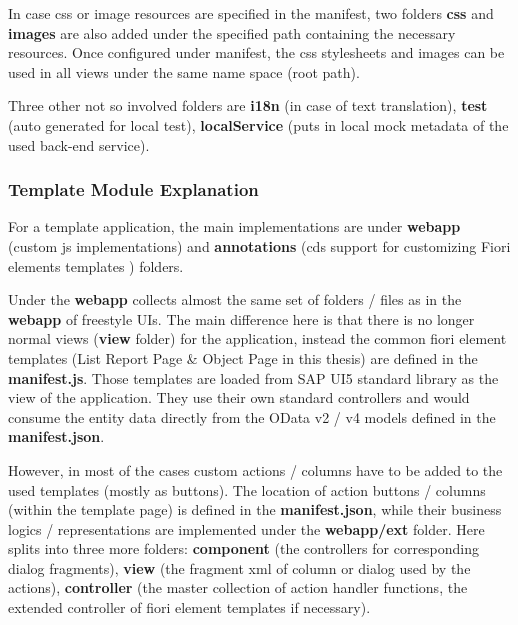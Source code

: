 In case css or image resources are specified in the manifest, two folders \textbf{css} and \textbf{images} are also added under the specified path containing the necessary resources. Once configured under manifest, the css stylesheets and images can be used in all views under the same name space (root path).

Three other not so involved folders are \textbf{i18n} (in case of text translation), \textbf{test} (auto generated for local test), \textbf{localService} (puts in local mock metadata of the used back-end service).

\subsubsection{Template Module Explanation}

For a template application, the main implementations are under \textbf{webapp} (custom js implementations) and \textbf{annotations} (cds support for customizing Fiori elements templates \cite{fiori-showcase}\cite{fiori-design}\cite{fiori-toolkit}) folders.

\bigskip
Under the \textbf{webapp} collects almost the same set of folders / files as in the \textbf{webapp} of freestyle UIs. The main difference here is that there is no longer normal views (\textbf{view} folder) for the application, instead the common fiori element templates (List Report Page \& Object Page in this thesis) are defined in the \textbf{manifest.js}. Those templates are loaded from SAP UI5 standard library as the view of the application. They use their own standard controllers and would consume the entity data directly from the OData v2 / v4 models defined in the \textbf{manifest.json}. 


However, in most of the cases custom actions / columns have to be added to the used templates (mostly as buttons). The location of action buttons / columns (within the template page) is defined in the \textbf{manifest.json}, while their business logics / representations are implemented under the \textbf{webapp/ext} folder. Here splits into three more folders: \textbf{component} (the controllers for corresponding dialog fragments), \textbf{view} (the fragment xml of column or dialog used by the actions), \textbf{controller} (the master collection of action handler functions, the extended controller of fiori element templates if necessary).

